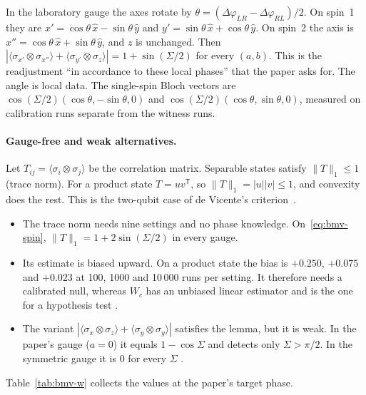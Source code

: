 In the laboratory gauge the axes rotate by $\theta=(\Delta\varphi_{LR}-\Delta\varphi_{RL})/2$. On spin~1 they are
$x'=\cos\theta\,\hat x-\sin\theta\,\hat y$ and $y'=\sin\theta\,\hat x+\cos\theta\,\hat y$. On spin~2 the axis is
$x''=\cos\theta\,\hat x+\sin\theta\,\hat y$, and $z$ is unchanged. Then
$|\langle\sigma_{x'}\otimes\sigma_{x''}\rangle+\langle\sigma_{y'}\otimes\sigma_z\rangle|=1+\sin(\Sigma/2)$ for every $(a,b)$. This is the
readjustment ``in accordance to these local phases'' that the paper asks for. The angle is local data. The single-spin Bloch vectors are
$\cos(\Sigma/2)(\cos\theta,-\sin\theta,0)$ and $\cos(\Sigma/2)(\cos\theta,\sin\theta,0)$, measured on calibration runs separate from the
witness runs.

\paragraph{Gauge-free and weak alternatives.} Let $T_{ij}=\langle\sigma_i\otimes\sigma_j\rangle$ be the correlation matrix. Separable states
satisfy $\|T\|_1\le1$ (trace norm). For a product state $T=uv^{\mathsf T}$, so $\|T\|_1=|u||v|\le1$, and convexity does the rest. This is the
two-qubit case of de Vicente's criterion~\cite{devicente2007}.
\begin{itemize}[nosep]
\item The trace norm needs nine settings and no phase knowledge. On~\eqref{eq:bmv-spin}, $\|T\|_1=1+2\sin(\Sigma/2)$ in every gauge.
\item Its estimate is biased upward. On a product state the bias is $+0.250$, $+0.075$ and $+0.023$ at 100, 1000 and 10\,000 runs per
setting. It therefore needs a calibrated null, whereas $W_c$ has an unbiased linear estimator and is the one for a hypothesis test
.
\item The variant $|\langle\sigma_x\otimes\sigma_z\rangle+\langle\sigma_y\otimes\sigma_y\rangle|$ satisfies the lemma, but it is weak. In the
paper's gauge ($a=0$) it equals $1-\cos\Sigma$ and detects only $\Sigma>\pi/2$. In the symmetric gauge it is 0 for every $\Sigma$
.
\end{itemize}
Table~\ref{tab:bmv-w} collects the values at the paper's target phase.

